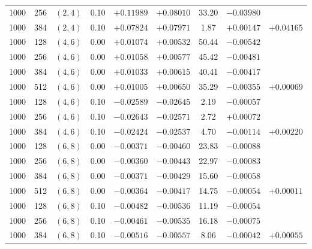 \begin{table}[!htbp]
\begin{tabular}{@{}ccccccccc@{}}
1000 & 256 & $(2,4)$ & 0.10 & $+0.11989$ & $+0.08010$ & 33.20 & $-0.03980$ &  \\
1000 & 384 & $(2,4)$ & 0.10 & $+0.07824$ & $+0.07971$ &  1.87 & $+0.00147$ & $+0.04165$ \\
\hline
1000 & 128 & $(4,6)$ & 0.00 & $+0.01074$ & $+0.00532$ & 50.44 & $-0.00542$ &  \\
1000 & 256 & $(4,6)$ & 0.00 & $+0.01058$ & $+0.00577$ & 45.42 & $-0.00481$ &  \\
1000 & 384 & $(4,6)$ & 0.00 & $+0.01033$ & $+0.00615$ & 40.41 & $-0.00417$ &  \\
1000 & 512 & $(4,6)$ & 0.00 & $+0.01005$ & $+0.00650$ & 35.29 & $-0.00355$ & $+0.00069$ \\
\hline
1000 & 128 & $(4,6)$ & 0.10 & $-0.02589$ & $-0.02645$ &  2.19 & $-0.00057$ &  \\
1000 & 256 & $(4,6)$ & 0.10 & $-0.02643$ & $-0.02571$ &  2.72 & $+0.00072$ &  \\
1000 & 384 & $(4,6)$ & 0.10 & $-0.02424$ & $-0.02537$ &  4.70 & $-0.00114$ & $+0.00220$ \\
\hline
1000 & 128 & $(6,8)$ & 0.00 & $-0.00371$ & $-0.00460$ & 23.83 & $-0.00088$ &  \\
1000 & 256 & $(6,8)$ & 0.00 & $-0.00360$ & $-0.00443$ & 22.97 & $-0.00083$ &  \\
1000 & 384 & $(6,8)$ & 0.00 & $-0.00371$ & $-0.00429$ & 15.60 & $-0.00058$ &  \\
1000 & 512 & $(6,8)$ & 0.00 & $-0.00364$ & $-0.00417$ & 14.75 & $-0.00054$ & $+0.00011$ \\
\hline
1000 & 128 & $(6,8)$ & 0.10 & $-0.00482$ & $-0.00536$ & 11.19 & $-0.00054$ &  \\
1000 & 256 & $(6,8)$ & 0.10 & $-0.00461$ & $-0.00535$ & 16.18 & $-0.00075$ &  \\
1000 & 384 & $(6,8)$ & 0.10 & $-0.00516$ & $-0.00557$ &  8.06 & $-0.00042$ & $+0.00055$ \\
\hline
\end{tabular}
\end{table}
